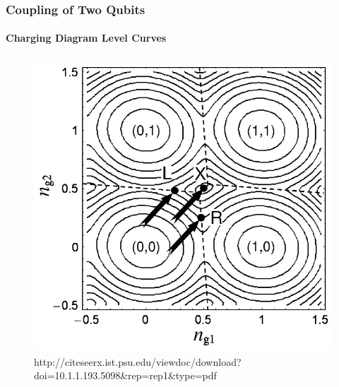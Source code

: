 \documentclass{beamer}
\begin{document}
\begin{frame}
    \frametitle{Coupling of Two Qubits}
    \framesubtitle{Charging Diagram Level Curves}
    \begin{figure}[ht!]
        \centering
        \includegraphics[height=0.6\textheight]{img/charging-level-curves.jpg}
        \caption{http://citeseerx.ist.psu.edu/viewdoc/download?doi=10.1.1.193.5098\&rep=rep1\&type=pdf}
    \end{figure}
\end{frame}

\end{document}
